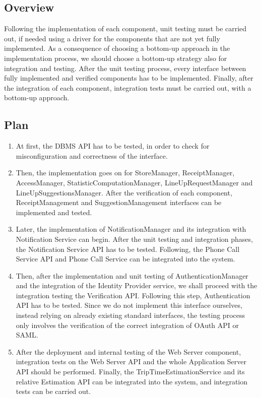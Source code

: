 \documentclass[../../main.tex]{subfiles}
\begin{document}
\subsection{Overview}

Following the implementation of each component, unit testing must be carried out, if needed using a driver for the components that are not yet fully implemented. 
As a consequence of choosing a bottom-up approach in the implementation process, we should choose a bottom-up strategy also for integration and testing. 
After the unit testing process, every interface between fully implemented and verified components has to be implemented. 
Finally, after the integration of each component, integration tests must be carried out, with a bottom-up approach. 

\subsection{Plan}

\begin{enumerate}

	\item At first, the DBMS API has to be tested, in order to check for misconfiguration and correctness of the interface.

	\item Then, the implementation goes on for StoreManager, ReceiptManager, AccessManager, StatisticComputationManager, LineUpRequestManager and LineUpSuggestionsManager. 
	After the verification of each component, ReceiptManagement and SuggestionManagement interfaces can be implemented and tested.

	\item Later, the implementation of NotificationManager and its integration with Notification Service can begin. 
	After the unit testing and integration phases, the Notification Service API has to be tested. 
	Following, the Phone Call Service API and Phone Call Service can be integrated into the system.

	\item Then, after the implementation and unit testing of AuthenticationManager and the integration of the Identity Provider service, we shall proceed with the integration testing the Verification API. 
	Following this step, Authentication API has to be tested. Since we do not implement this interface ourselves, instead relying on already existing standard interfaces, the testing process only involves the verification of the correct integration of OAuth API or SAML.

	\item After the deployment and internal testing of the Web Server component, integration tests on the Web Server API and the whole Application Server API should be performed. 
	Finally, the TripTimeEstimationService and its relative Estimation API can be integrated into the system, and integration tests can be carried out. 

\end{enumerate}
\end{document}
